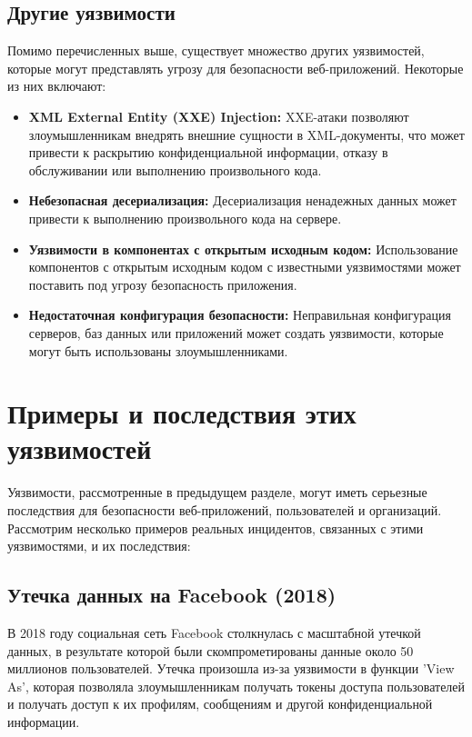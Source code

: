 \documentclass[a4paper,12pt]{diplom}
\begin{document}
	 \subsection{Другие уязвимости}
	 
	 Помимо перечисленных выше, существует множество других уязвимостей, которые могут представлять угрозу для безопасности веб-приложений. Некоторые из них включают:
	 
	 \begin{itemize}
	 	\item \textbf{XML External Entity (XXE) Injection:}  XXE-атаки позволяют злоумышленникам внедрять внешние сущности в XML-документы, что может привести к раскрытию конфиденциальной информации, отказу в обслуживании или выполнению произвольного кода. 
	 	\item \textbf{Небезопасная десериализация:}  Десериализация ненадежных данных может привести к выполнению произвольного кода на сервере. 
	 	\item \textbf{Уязвимости в компонентах с открытым исходным кодом:}  Использование компонентов с открытым исходным кодом с известными уязвимостями может поставить под угрозу безопасность приложения. 
	 	\item \textbf{Недостаточная конфигурация безопасности:}  Неправильная конфигурация серверов, баз данных или приложений может создать уязвимости, которые могут быть использованы злоумышленниками. 
	 \end{itemize}
	 
	 
	 
	 
	 
	 
	 
	 
	 
	 
	 
	 
	 \section{Примеры и последствия этих уязвимостей}
	 
	 Уязвимости, рассмотренные в предыдущем разделе, могут иметь серьезные последствия для безопасности веб-приложений, пользователей и организаций. Рассмотрим несколько примеров реальных инцидентов, связанных с этими уязвимостями, и их последствия:
	 
	 \subsection{Утечка данных на Facebook (2018)}
	 
	 В 2018 году социальная сеть Facebook столкнулась с масштабной утечкой данных, в результате которой были скомпрометированы данные около 50 миллионов пользователей. Утечка произошла из-за уязвимости в функции 'View As', которая позволяла злоумышленникам получать токены доступа пользователей и получать доступ к их профилям, сообщениям и другой конфиденциальной информации.\cite{Facebook_attack}
	 
\end{document}
